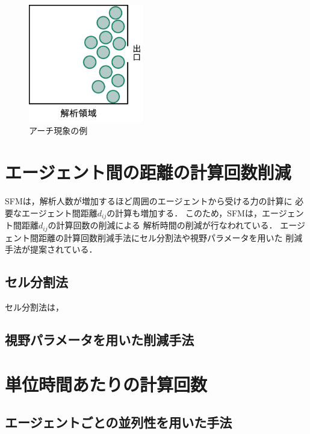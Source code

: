 \begin{figure}[hbtp]
 \begin{center}
  \includegraphics[width=5cm,clip]{figure/atigenshou.eps}
  \caption{アーチ現象の例}
  \label{fig:atigenshou}
 \end{center}
\end{figure}

\section{エージェント間の距離の計算回数削減}
SFMは，解析人数が増加するほど周囲のエージェントから受ける力の計算に
必要なエージェント間距離$d_{ij}$の計算も増加する．
このため，SFMは，エージェント間距離$d_{ij}$の計算回数の削減による
解析時間の削減が行なわれている．
エージェント間距離の計算回数削減手法にセル分割法や視野パラメータを用いた
削減手法が提案されている．

\subsection{セル分割法}
セル分割法は，


\subsection{視野パラメータを用いた削減手法}

\section{単位時間あたりの計算回数}

\subsection{エージェントごとの並列性を用いた手法}

